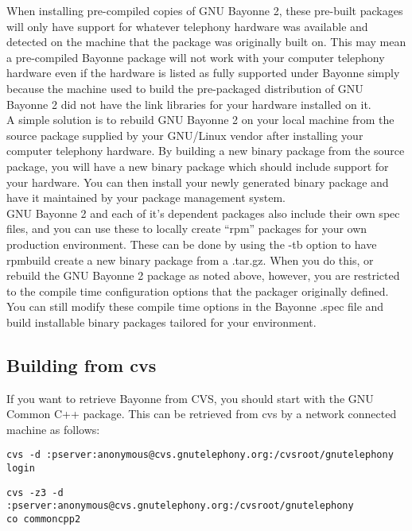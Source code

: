 \documentclass[a4paper,12pt]{article}
\begin{document}
When installing pre-compiled copies of GNU Bayonne 2, these pre-built
packages will only have support for whatever telephony hardware was
available and detected on the machine that the package was originally
built on.  This may mean a pre-compiled Bayonne package will not work
with your computer telephony hardware even if the hardware is listed as
fully supported under Bayonne simply because the machine used to build
the pre-packaged distribution of GNU Bayonne 2 did not have the link
libraries for your hardware installed on it. \\

A simple solution is to rebuild GNU Bayonne 2 on your local machine from the
source package supplied by your GNU/Linux vendor after installing your
computer telephony hardware.  By building a new binary package from the
source package, you will have a new binary package which should include
support for your hardware.  You can then install your newly generated
binary package and have it maintained by your package management system. \\

GNU Bayonne 2 and each of it's dependent packages also include their own
spec files, and you can use these to locally create ``rpm'' packages for
your own production environment.  These can be done by using the -tb
option to have rpmbuild create a new binary package from a .tar.gz.  When
you do this, or rebuild the GNU Bayonne 2 package as noted above, however,
you are restricted to the compile time configuration options that the
packager originally defined.  You can still modify these compile time
options in the Bayonne .spec file and build installable binary packages
tailored for your environment. \\

\subsection{Building from cvs}

If you want to retrieve Bayonne from CVS, you should start with the
GNU Common C++ package.  This can be retrieved from cvs by a network
connected machine as follows: \\

\begin{verbatim}
cvs -d :pserver:anonymous@cvs.gnutelephony.org:/cvsroot/gnutelephony 
login
\end{verbatim}

\begin{verbatim}
cvs -z3 -d :pserver:anonymous@cvs.gnutelephony.org:/cvsroot/gnutelephony 
co commoncpp2  
\end{verbatim}
\end{document}
